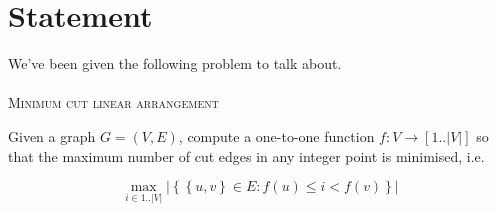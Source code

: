 \section{Statement} \label{sec:statement}

We've been given the following problem to talk about.

\paragraph{}

\textsc{Minimum cut linear arrangement}

Given a graph $G = (V, E)$, compute a one-to-one function 
$f : V \rightarrow [1..|V |]$ so that the maximum number of cut edges 
in any integer point is minimised, i.e.

\[
\max_{i \in 1..|V|}
  |
  \left \{
    \left \{
      u, v
    \right \} 
    \in E : f (u) \leq i < f (v)
  \right \}
  | 
\]
